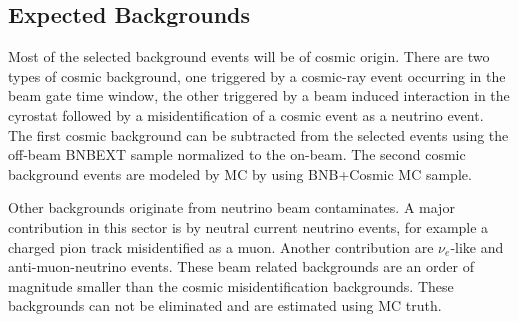 \begin{table}[!htp] \centering 
  \caption{Passing rates for Selection I selection applied to on-beam and off-beam data. The numbers in brackets give the passing rate wrt the step before (first percentage) and wrt the generated events (second percentage). Off-beam data has been scaled with a factor 1.23 to normalize to the on-beam data stream.} 
  \label{table:data} 
\small 
{} 
\end{table} 
\subsection{Expected Backgrounds}
Most of the selected background events will be of cosmic origin. There are two types of cosmic background, one triggered by a cosmic-ray event occurring in the beam gate time window, the other triggered by a beam induced interaction in the cyrostat followed by a misidentification of a cosmic event as a neutrino event. The first cosmic background can be subtracted from the selected events using the off-beam BNBEXT sample normalized to the on-beam. The second cosmic background events are modeled by MC by using BNB+Cosmic MC sample. 

Other backgrounds originate from neutrino beam contaminates. A major contribution in this sector is by neutral current neutrino events, for example a charged pion track misidentified as a muon. Another contribution are $\nu_e$-like and anti-muon-neutrino events. These beam related backgrounds are an order of magnitude smaller than the cosmic misidentification backgrounds. These backgrounds can not be eliminated and are estimated using MC truth.

